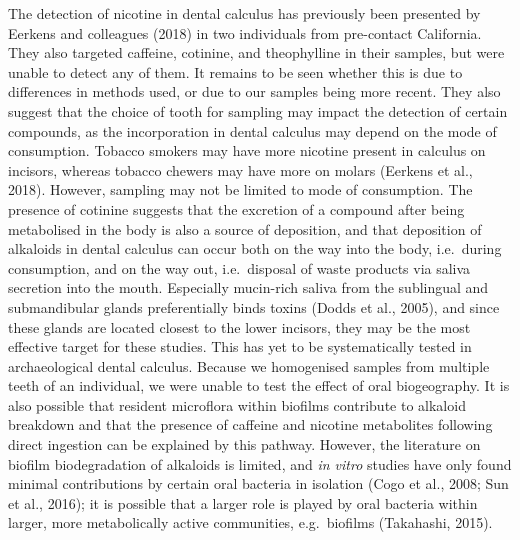 \documentclass[
]{article}
\begin{document}
The detection of nicotine in dental calculus has previously been
presented by Eerkens and colleagues (2018) in two individuals from
pre-contact California. They also targeted caffeine, cotinine, and
theophylline in their samples, but were unable to detect any of them. It
remains to be seen whether this is due to differences in methods used,
or due to our samples being more recent. They also suggest that the
choice of tooth for sampling may impact the detection of certain
compounds, as the incorporation in dental calculus may depend on the
mode of consumption. Tobacco smokers may have more nicotine present in
calculus on incisors, whereas tobacco chewers may have more on molars
(Eerkens et al., 2018). However, sampling may not be limited to mode of
consumption. The presence of cotinine suggests that the excretion of a
compound after being metabolised in the body is also a source of
deposition, and that deposition of alkaloids in dental calculus can
occur both on the way into the body, i.e.~during consumption, and on the
way out, i.e.~disposal of waste products via saliva secretion into the
mouth. Especially mucin-rich saliva from the sublingual and
submandibular glands preferentially binds toxins (Dodds et al., 2005),
and since these glands are located closest to the lower incisors, they
may be the most effective target for these studies. This has yet to be
systematically tested in archaeological dental calculus. Because we
homogenised samples from multiple teeth of an individual, we were unable
to test the effect of oral biogeography. It is also possible that
resident microflora within biofilms contribute to alkaloid breakdown and
that the presence of caffeine and nicotine metabolites following direct
ingestion can be explained by this pathway. However, the literature on
biofilm biodegradation of alkaloids is limited, and \emph{in vitro}
studies have only found minimal contributions by certain oral bacteria
in isolation (Cogo et al., 2008; Sun et al., 2016); it is possible that
a larger role is played by oral bacteria within larger, more
metabolically active communities, e.g.~biofilms (Takahashi, 2015).
\end{document}

